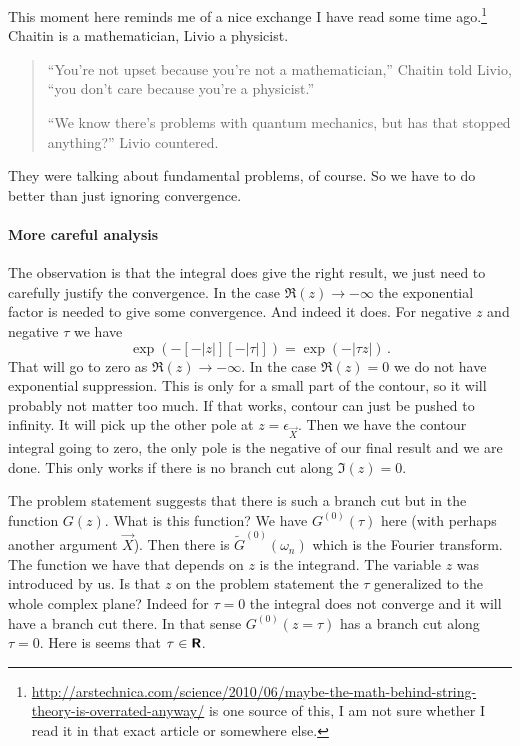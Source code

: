 \documentclass[11pt, english, fleqn, DIV=15, headinclude, BCOR=1cm]{scrartcl}
\begin{document}
This moment here reminds me of a nice exchange I have read some time
ago.\footnote{%
    \url{http://arstechnica.com/science/2010/06/maybe-the-math-behind-string-theory-is-overrated-anyway/}
    is one source of this, I am not sure whether I read it in that exact article
    or somewhere else.
}
Chaitin is a mathematician, Livio a physicist.

\begin{quote}
    \enquote{You're not upset because you're not a mathematician,} Chaitin told
    Livio, \enquote{you don't care because you're a physicist.} 

    \enquote{We know there's problems with quantum mechanics, but has that
    stopped anything?} Livio countered.
\end{quote}

They were talking about fundamental problems, of course. So we have to do
better than just ignoring convergence.

\paragraph{More careful analysis}

The observation is that the integral does give the right result, we just need
to carefully justify the convergence. In the case $\Re(z) \to - \infty$ the
exponential factor is needed to give some convergence. And indeed it does. For
negative $z$ and negative $\tau$ we have
\[
    \exp(- [-|z|][- |\tau|])
    = \exp(- |\tau z|) \,.
\]
That will go to zero as $\Re(z) \to - \infty$. In the case $\Re(z) = 0$ we do
not have exponential suppression. This is only for a small part of the contour,
so it will probably not matter too much. If that works, contour can just be
pushed to infinity. It will pick up the other pole at $z = \epsilon_{\vec X}$.
Then we have the contour integral going to zero, the only pole is the negative
of our final result and we are done. This only works if there is no branch cut
along $\Im(z) = 0$.

The problem statement suggests that there is such a branch cut but in the
function $G(z)$. What is this function? We have $G^{(0)}(\tau)$ here (with
perhaps another argument $\vec X$). Then there is $\tilde G^{(0)}(\omega_n)$
which is the Fourier transform. The function we have that depends on $z$ is the
integrand. The variable $z$ was introduced by us. Is that $z$ on the problem
statement the $\tau$ generalized to the whole complex plane? Indeed for $\tau =
0$ the integral does not converge and it will have a branch cut there. In that
sense $G^{(0)}(z = \tau)$ has a branch cut along $\tau = 0$. Here is seems that
$\tau \in \text{\bfseries\sffamily R}$.
\end{document}
